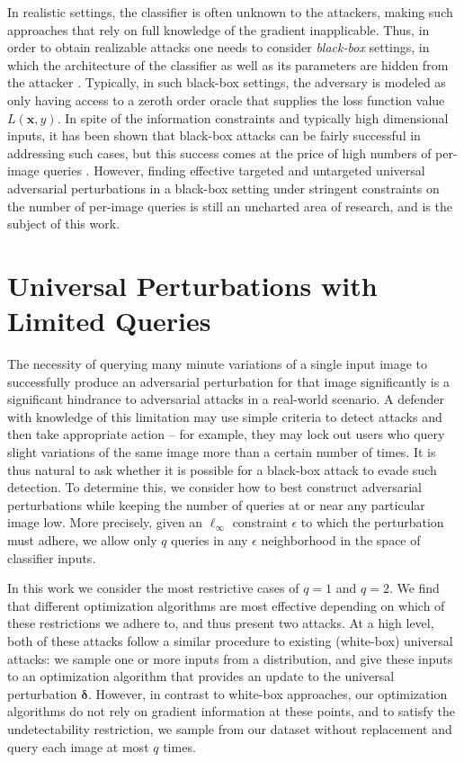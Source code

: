 \documentclass[letterpaper]{article}
\begin{document}
	In realistic settings, the classifier is often unknown to the attackers, making such approaches that rely on full knowledge of the gradient inapplicable. Thus, in order to obtain realizable attacks one needs to consider {\em black-box} settings, in which the architecture of the classifier  as well as its parameters are hidden from the attacker \cite{autozoom,zoo,bandits,nes}. Typically, in such black-box settings, the adversary is modeled as only having access to a zeroth order oracle that supplies the loss function value $L(\mathbf{x},y)$.
	In spite of the information constraints and typically high dimensional inputs, it has been shown that black-box attacks can be fairly successful in addressing such cases, but this success comes at the price of high numbers of per-image queries \citep{bandits,nes,parsimonious}. However, finding effective targeted and untargeted universal adversarial perturbations in a black-box setting under stringent constraints on the number of per-image queries is still an uncharted area of research, and is the subject of this work.
	
	
	\section{Universal Perturbations with Limited Queries}
	The necessity of querying many minute variations of a single input image to successfully produce an adversarial perturbation for that image significantly is a significant hindrance to adversarial attacks in a real-world scenario. A defender with knowledge of this limitation may use simple criteria to detect attacks and then take appropriate action -- for example, they may lock out users who query slight variations of the same image more than a certain number of times. It is thus natural to ask whether it is possible for a black-box attack to evade such detection. To determine this, we consider how to best construct adversarial perturbations while keeping the number of queries at or near any particular image low. More precisely, given an $\ell_{\infty}$ constraint $\epsilon$ to which the perturbation must adhere, we allow only $q$ queries in any $\epsilon$ neighborhood in the space of classifier inputs.
	
	In this work we consider the most restrictive cases of $q=1$ and $q=2$. We find that different optimization algorithms are most effective depending on which of these restrictions we adhere to, and thus present two attacks. At a high level, both of these attacks follow a similar procedure to existing (white-box) universal attacks: we sample one or more inputs from a distribution, and give these inputs to an optimization algorithm that provides an update to the universal perturbation $\boldsymbol{\delta}$. However, in contrast to white-box approaches, our optimization algorithms do not rely on gradient information at these points, and to satisfy the undetectability restriction, we sample from our dataset without replacement and query each image at most $q$ times.
	
\end{document}
